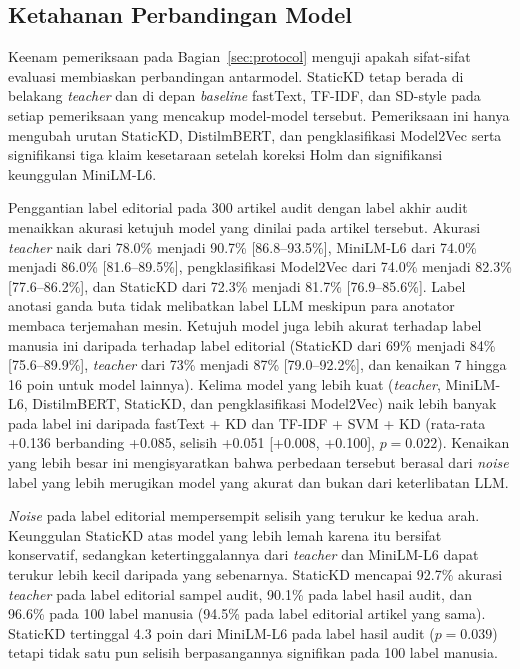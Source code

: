 \documentclass{ieeeaccess}
\newcommand{\en}[1]{\textit{#1}}
\begin{document}
\subsection{Ketahanan Perbandingan Model}
\label{sec:res-robust}
Keenam pemeriksaan pada Bagian~\ref{sec:protocol} menguji apakah sifat-sifat evaluasi membiaskan perbandingan antarmodel. StaticKD tetap berada di belakang \en{teacher} dan di depan \en{baseline} fastText, TF-IDF, dan SD-style pada setiap pemeriksaan yang mencakup model-model tersebut. Pemeriksaan ini hanya mengubah urutan StaticKD, DistilmBERT, dan pengklasifikasi Model2Vec serta signifikansi tiga klaim kesetaraan setelah koreksi Holm dan signifikansi keunggulan MiniLM-L6.

Penggantian label editorial pada 300 artikel audit dengan label akhir audit menaikkan akurasi ketujuh model yang dinilai pada artikel tersebut. Akurasi \en{teacher} naik dari 78.0\% menjadi 90.7\% [86.8--93.5\%], MiniLM-L6 dari 74.0\% menjadi 86.0\% [81.6--89.5\%], pengklasifikasi Model2Vec dari 74.0\% menjadi 82.3\% [77.6--86.2\%], dan StaticKD dari 72.3\% menjadi 81.7\% [76.9--85.6\%]. Label anotasi ganda buta tidak melibatkan label LLM meskipun para anotator membaca terjemahan mesin. Ketujuh model juga lebih akurat terhadap label manusia ini daripada terhadap label editorial (StaticKD dari 69\% menjadi 84\% [75.6--89.9\%], \en{teacher} dari 73\% menjadi 87\% [79.0--92.2\%], dan kenaikan 7 hingga 16 poin untuk model lainnya). Kelima model yang lebih kuat (\en{teacher}, MiniLM-L6, DistilmBERT, StaticKD, dan pengklasifikasi Model2Vec) naik lebih banyak pada label ini daripada fastText + KD dan TF-IDF + SVM + KD (rata-rata +0.136 berbanding +0.085, selisih +0.051 [+0.008, +0.100], $p=0.022$). Kenaikan yang lebih besar ini mengisyaratkan bahwa perbedaan tersebut berasal dari \en{noise} label yang lebih merugikan model yang akurat dan bukan dari keterlibatan LLM.

\en{Noise} pada label editorial mempersempit selisih yang terukur ke kedua arah. Keunggulan StaticKD atas model yang lebih lemah karena itu bersifat konservatif, sedangkan ketertinggalannya dari \en{teacher} dan MiniLM-L6 dapat terukur lebih kecil daripada yang sebenarnya. StaticKD mencapai 92.7\% akurasi \en{teacher} pada label editorial sampel audit, 90.1\% pada label hasil audit, dan 96.6\% pada 100 label manusia (94.5\% pada label editorial artikel yang sama). StaticKD tertinggal 4.3 poin dari MiniLM-L6 pada label hasil audit ($p=0.039$) tetapi tidak satu pun selisih berpasangannya signifikan pada 100 label manusia.
\end{document}
